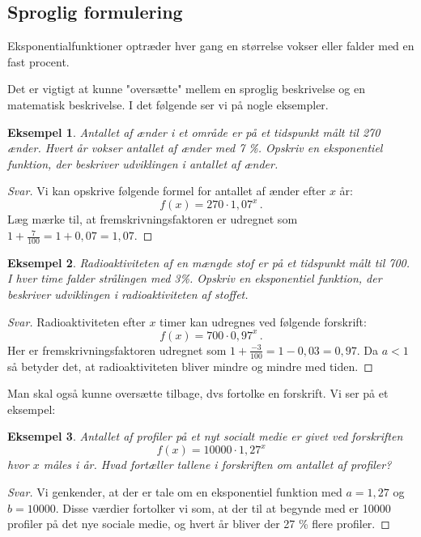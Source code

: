 \documentclass[12pt,oneside,a4paper]{article}
\theoremstyle{plain}
\newtheorem*{eks}{Eksempel}
\begin{document}
\subsection*{Sproglig formulering}
Eksponentialfunktioner optræder hver gang en størrelse vokser eller falder
med en fast procent.

Det er vigtigt at kunne "oversætte" mellem en sproglig beskrivelse og en matematisk beskrivelse.
I det følgende ser vi på nogle eksempler.

\begin{eks}
    Antallet af ænder i et område er på et tidspunkt målt til 270 ænder. Hvert
    år vokser antallet af ænder med 7 \%. Opskriv en eksponentiel funktion, der
    beskriver udviklingen i antallet af ænder.
\end{eks}
\begin{proof}[Svar]
    Vi kan opskrive følgende formel for antallet af ænder efter $x$ år:
    $$
    f(x) = 270 \cdot 1,07^x\,.
    $$
    Læg mærke til, at fremskrivningsfaktoren er udregnet som $1+\frac{7}{100} =
    1+0,07 = 1,07$.
\end{proof}

\begin{eks}
    Radioaktiviteten af en mængde stof er på et tidspunkt målt til 700. I
    hver time falder strålingen med 3\%. Opskriv en eksponentiel funktion,
    der beskriver udviklingen i radioaktiviteten af stoffet.
\end{eks}
\begin{proof}[Svar]
    Radioaktiviteten efter $x$ timer kan udregnes ved følgende forskrift:
    $$
    f(x) = 700 \cdot 0,97^x\,.
    $$
    Her er fremskrivningsfaktoren udregnet som $1 + \frac{-3}{100} = 1-0,03 = 0,97$.
    Da $a<1$ så betyder det, at radioaktiviteten bliver mindre og mindre med tiden.
\end{proof}

Man skal også kunne oversætte tilbage, dvs fortolke en forskrift. Vi ser på et eksempel:

\begin{eks}
    Antallet af profiler på et nyt socialt medie er givet ved forskriften
    $$
    f(x) = 10000 \cdot 1,27^x
    $$
    hvor $x$ måles i år. Hvad fortæller tallene i forskriften om antallet af
    profiler?
\end{eks}
\begin{proof}[Svar]
    Vi genkender, at der er tale om en eksponentiel funktion med $a=1,27$ og
    $b=10000$.  Disse værdier fortolker vi som, at der til at begynde med er
    10000 profiler på det nye sociale medie, og hvert år bliver der 27 \% flere
    profiler.
\end{proof}
\end{document}
